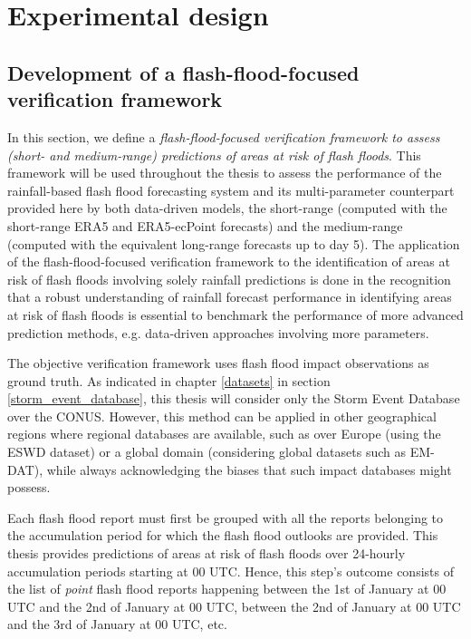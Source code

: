 \chapter{Experimental design}
\label{experimental_design}
\graphicspath{{chapter_04/figures}{chapter_04/tables}}



\section{Development of a flash-flood-focused verification framework}

In this section, we define a \textit{flash-flood-focused verification framework to assess (short- and medium-range) predictions of areas at risk of flash floods}. This framework will be used throughout the thesis to assess the performance of the rainfall-based flash flood forecasting system and its multi-parameter counterpart provided here by both data-driven models, the short-range (computed with the short-range ERA5 and ERA5-ecPoint forecasts) and the medium-range (computed with the equivalent long-range forecasts up to day 5). The application of the flash-flood-focused verification framework to the identification of areas at risk of flash floods involving solely rainfall predictions is done in the recognition that a robust understanding of rainfall forecast performance in identifying areas at risk of flash floods is essential to benchmark the performance of more advanced prediction methods, e.g. data-driven approaches involving more parameters.

The objective verification framework uses flash flood impact observations as ground truth. As indicated in chapter \ref{datasets} in section \ref{storm_event_database}, this thesis will consider only the Storm Event Database over the CONUS. However, this method can be applied in other geographical regions where regional databases are available, such as over Europe (using the ESWD dataset) or a global domain (considering global datasets such as EM-DAT), while always acknowledging the biases that such impact databases might possess. 

Each flash flood report must first be grouped with all the reports belonging to the accumulation period for which the flash flood outlooks are provided. This thesis provides predictions of areas at risk of flash floods over 24-hourly accumulation periods starting at 00 UTC. Hence, this step's outcome consists of the list of \textit{point} flash flood reports happening between the 1st of January at 00 UTC and the 2nd of January at 00 UTC, between the 2nd of January at 00 UTC and the 3rd of January at 00 UTC, etc. 

